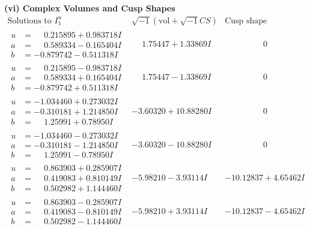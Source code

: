 \documentclass[1p]{elsarticle_modified}
\theoremstyle{definition}
\newcommand{\I}{\sqrt{-1}}
\begin{document}
\newpage\flushleft \textbf{(vi) Complex Volumes and Cusp Shapes}
$$\begin{array}{c|c|c}  
\text{Solutions to }I^u_{1}& \I (\text{vol} + \sqrt{-1}CS) & \text{Cusp shape}\\
 \hline 
\begin{aligned}
u &= \phantom{-}0.215895 + 0.983718 I \\
a &= \phantom{-}0.589334 - 0.165404 I \\
b &= -0.879742 - 0.511318 I\end{aligned}
 & \phantom{-}1.75447 + 1.33869 I & \phantom{-0.000000 } 0 \\ \hline\begin{aligned}
u &= \phantom{-}0.215895 - 0.983718 I \\
a &= \phantom{-}0.589334 + 0.165404 I \\
b &= -0.879742 + 0.511318 I\end{aligned}
 & \phantom{-}1.75447 - 1.33869 I & \phantom{-0.000000 } 0 \\ \hline\begin{aligned}
u &= -1.034460 + 0.273032 I \\
a &= -0.310181 + 1.214850 I \\
b &= \phantom{-}1.25991 + 0.78950 I\end{aligned}
 & -3.60320 + 10.88280 I & \phantom{-0.000000 } 0 \\ \hline\begin{aligned}
u &= -1.034460 - 0.273032 I \\
a &= -0.310181 - 1.214850 I \\
b &= \phantom{-}1.25991 - 0.78950 I\end{aligned}
 & -3.60320 - 10.88280 I & \phantom{-0.000000 } 0 \\ \hline\begin{aligned}
u &= \phantom{-}0.863903 + 0.285907 I \\
a &= \phantom{-}0.419083 + 0.810149 I \\
b &= \phantom{-}0.502982 + 1.144460 I\end{aligned}
 & -5.98210 - 3.93114 I & -10.12837 + 4.65462 I \\ \hline\begin{aligned}
u &= \phantom{-}0.863903 - 0.285907 I \\
a &= \phantom{-}0.419083 - 0.810149 I \\
b &= \phantom{-}0.502982 - 1.144460 I\end{aligned}
 & -5.98210 + 3.93114 I & -10.12837 - 4.65462 I \\ \hline\begin{aligned}

\end{aligned}
\end{array}$$
\end{document}
